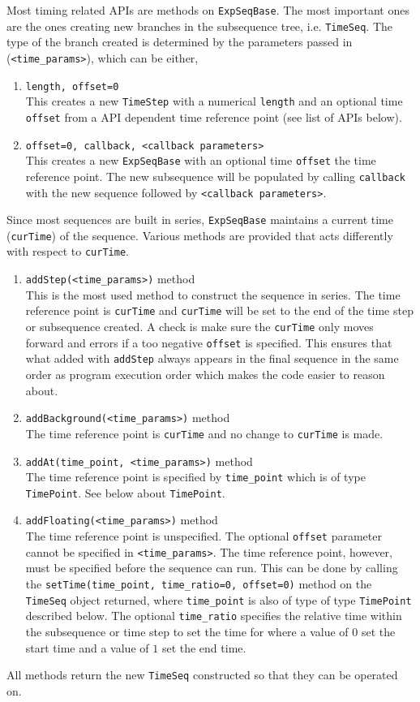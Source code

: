Most timing related APIs are methods on \verb`ExpSeqBase`.
The most important ones are the ones creating new branches
in the subsequence tree, i.e. \verb`TimeSeq`.
The type of the branch created is determined by the parameters passed in
(\verb`<time_params>`), which can be either,
\begin{enumerate}
\item \verb`length, offset=0`\\
  This creates a new \verb`TimeStep` with a numerical \verb`length`
  and an optional time \verb`offset` from a API dependent time reference point
  (see list of APIs below).
\item \verb`offset=0, callback, <callback parameters>`\\
  This creates a new \verb`ExpSeqBase` with an optional time \verb`offset`
  the time reference point.
  The new subsequence will be populated by calling \verb`callback`
  with the new sequence followed by \verb`<callback parameters>`.
\end{enumerate}
Since most sequences are built in series, \verb`ExpSeqBase` maintains
a current time (\verb`curTime`) of the sequence.
Various methods are provided that acts differently with respect to \verb`curTime`.
\begin{enumerate}
\item \verb`addStep(<time_params>)` method\\
  This is the most used method to construct the sequence in series.
  The time reference point is \verb`curTime` and
  \verb`curTime` will be set to the end of the time step or subsequence created.
  A check is make sure the \verb`curTime` only moves forward and
  errors if a too negative \verb`offset` is specified.
  This ensures that what added with \verb`addStep` always appears in the final
  sequence in the same order as program execution order
  which makes the code easier to reason about.
\item \verb`addBackground(<time_params>)` method\\
  The time reference point is \verb`curTime` and no change to \verb`curTime` is made.
\item \verb`addAt(time_point, <time_params>)` method\\
  The time reference point is specified by \verb`time_point` which is of type \verb`TimePoint`.
  See below about \verb`TimePoint`.
\item \verb`addFloating(<time_params>)` method\\
  The time reference point is unspecified.
  The optional \verb`offset` parameter cannot be specified in \verb`<time_params>`.
  The time reference point, however, must be specified before the sequence can run.
  This can be done by calling the \verb`setTime(time_point, time_ratio=0, offset=0)` method
  on the \verb`TimeSeq` object returned,
  where \verb`time_point` is also of type of type \verb`TimePoint` described below.
  The optional \verb`time_ratio` specifies the relative time within the subsequence
  or time step to set the time for where a value of $0$ set the start time
  and a value of $1$ set the end time.
\end{enumerate}
All methods return the new \verb`TimeSeq` constructed so that they can be operated on.

